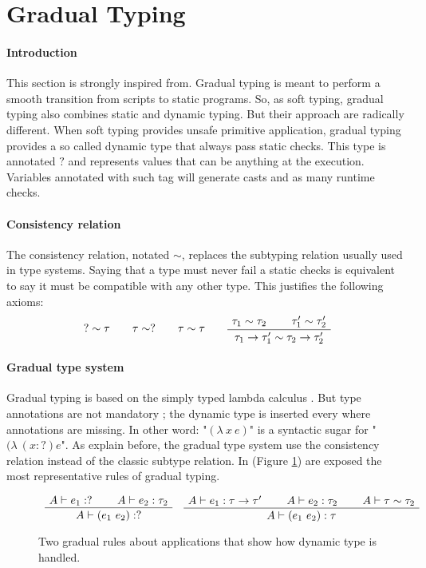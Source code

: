 \documentclass[a4paper]{report}
\newcommand{\reffig}[1]{(Figure \ref{#1})}
\newcommand{\ax}[1]%
{\AxiomC{$#1$}}
\newcommand{\bic}[1]%
{\BinaryInfC{$#1$}}
\newcommand{\tric}[1]%
{\TrinaryInfC{$#1$}}
\newcommand{\drule}%
{\DisplayProof}
\begin{document}
\section{Gradual Typing}

\paragraph{Introduction} This section is strongly inspired from\cite{grad3}. Gradual typing is meant to perform a smooth transition from scripts to static programs. So, as soft typing, gradual typing also combines static and dynamic typing. But their approach are radically different. When soft typing provides unsafe primitive application, gradual typing provides a so called dynamic type that always pass static checks. This type is annotated $?$ and represents values that can be anything at the execution. Variables annotated with such tag will generate casts and as many runtime checks.

\paragraph{Consistency relation} The consistency relation, notated $\sim$, replaces the subtyping relation usually used in type systems. Saying that a type must never fail a static checks is equivalent to say it must be compatible with any other type. This justifies the following axioms:
$$\begin{array}{ccccccc}
?\sim\tau
&&
\tau\sim ?
&&
\tau\sim\tau
&&
\ax{\tau_1\sim\tau_2}
\ax{\tau_1'\sim\tau_2'}
\bic{\tau_1\to\tau_1'\sim\tau_2\to\tau_2'}
\drule\\
\end{array}$$

\paragraph{Gradual type system} Gradual typing is based on the simply typed lambda calculus \cite{typedlambda}. But type annotations are not mandatory ; the dynamic type is inserted every where annotations are missing. In other word: "$(\lambda\ x\ e)$" is a syntactic sugar for "$(\lambda \ (x:?) e$". As explain before, the gradual type system use the consistency relation instead of the classic subtype relation. In \reffig{grad_ts} are exposed the most representative rules of gradual typing.

\begin{figure}
\centering
$$\begin{array}{cc}
\ax{A\vdash e_1:?}
\ax{A\vdash e_2:\tau_2}
\bic{A\vdash (e_1\ e_2):?}
\drule
&
\ax{A\vdash e_1:\tau\to\tau'}
\ax{A\vdash e_2:\tau_2}
\ax{A\vdash\tau\sim\tau_2}
\tric{A\vdash (e_1\ e_2):\tau}
\drule
\end{array}$$
\caption{Two gradual rules about applications that show how dynamic type is handled.}
\label{grad_ts}
\end{figure}
\end{document}
